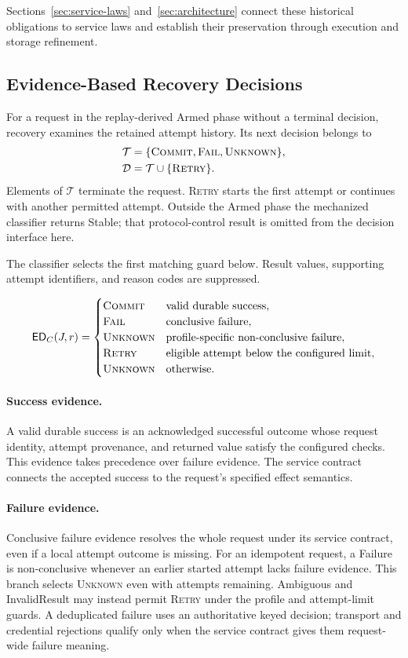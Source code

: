 \documentclass[acmsmall,screen,review,anonymous]{acmart}
\newcommand{\Unknown}{\textsc{Unknown}\xspace}
\newcommand{\Commit}{\textsc{Commit}\xspace}
\newcommand{\Fail}{\textsc{Fail}\xspace}
\newcommand{\Retry}{\textsc{Retry}\xspace}
\begin{document}
Sections~\ref{sec:service-laws} and~\ref{sec:architecture} connect these historical obligations to service laws
and establish their preservation through execution and storage refinement.

\subsection{Evidence-Based Recovery Decisions}

For a request in the replay-derived Armed phase without a terminal
decision, recovery examines the retained attempt history.
Its next decision belongs to
\[
\begin{aligned}
  \mathcal{T} &= \{\Commit,\Fail,\Unknown\},\\
  \mathcal{D} &= \mathcal{T}\cup\{\Retry\}.
\end{aligned}
\]
Elements of $\mathcal{T}$ terminate the request. \Retry starts the
first attempt or continues with another permitted attempt. Outside
the Armed phase the mechanized classifier returns Stable; that
protocol-control result is omitted from the decision interface here.

The classifier selects the first matching guard below. Result values,
supporting attempt identifiers, and reason codes are suppressed.

\[
\mathsf{ED}_C(J,r)=
\begin{cases}
  \Commit
    & \text{valid durable success},\\
  \Fail
    & \text{conclusive failure},\\
  \Unknown
    & \text{profile-specific non-conclusive failure},\\
  \Retry
    & \text{eligible attempt below the configured limit},\\
  \Unknown
    & \text{otherwise}.
\end{cases}
\]
\paragraph{Success evidence.}
A valid durable success is an acknowledged successful outcome
whose request identity, attempt provenance, and returned value
satisfy the configured checks. This evidence takes precedence
over failure evidence. The service contract connects the accepted
success to the request's specified effect semantics.

\paragraph{Failure evidence.}
Conclusive failure evidence resolves the whole request under its service
contract, even if a local attempt outcome is missing. For an idempotent
request, a Failure is non-conclusive whenever an earlier started attempt
lacks failure evidence. This branch selects \Unknown even with attempts
remaining. Ambiguous and InvalidResult may instead permit \Retry under the
profile and attempt-limit guards. A deduplicated failure uses an
authoritative keyed decision; transport and credential rejections qualify
only when the service contract gives them request-wide failure meaning.
\end{document}
